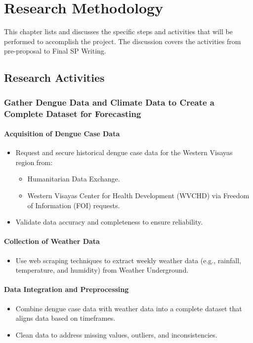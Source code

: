 \chapter{Research Methodology}
This chapter lists and discusses the specific steps and activities that will be performed to accomplish the project. 
The discussion covers the activities from pre-proposal to Final SP Writing.

\section{Research Activities}

\subsection{Gather Dengue Data and Climate Data to Create a Complete Dataset for Forecasting}

\subsubsection{Acquisition of Dengue Case Data}
\begin{itemize}
	\item Request and secure historical dengue case data for the Western Visayas region from:
	\begin{itemize}
		\item Humanitarian Data Exchange.
		\item Western Visayas Center for Health Development (WVCHD) via Freedom of Information (FOI) requests.
	\end{itemize}
	\item Validate data accuracy and completeness to ensure reliability.
\end{itemize}

\subsubsection{Collection of Weather Data}
\begin{itemize}
	\item Use web scraping techniques to extract weekly weather data (e.g., rainfall, temperature, and humidity) from Weather Underground.
\end{itemize}

\subsubsection{Data Integration and Preprocessing}
\begin{itemize}
	\item Combine dengue case data with weather data into a complete dataset that aligns data based on timeframes.
	\item Clean data to address missing values, outliers, and inconsistencies.
\end{itemize}


